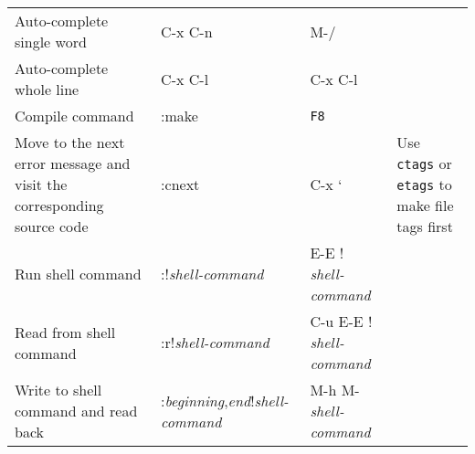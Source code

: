 \begin{table}[htbp]
\begin{minipage}{\linewidth}
\begin{tabulary}{\textwidth}{@{}LLLL@{}}
Auto-complete single word&C-x C-n&M-\slash &\\
Auto-complete whole line&C-x C-l&C-x C-l&\\
Compile command&:make&\texttt{F8}&\\
Move to the next error message and visit the corresponding source code&:cnext&C-x `&Use \texttt{ctags} or \texttt{etags} to make file tags first\\
Run shell command&:!\emph{shell-command}&E-E ! \emph{shell-command}&\\
Read from shell command&:r!\emph{shell-command}&C-u E-E ! \emph{shell-command}&\\
Write to shell command and read back&:\emph{beginning},\emph{end}!\emph{shell-command}&M-h M- \emph{shell-command}&\\

\bottomrule

\end{tabulary}
\end{minipage}
\end{table}
